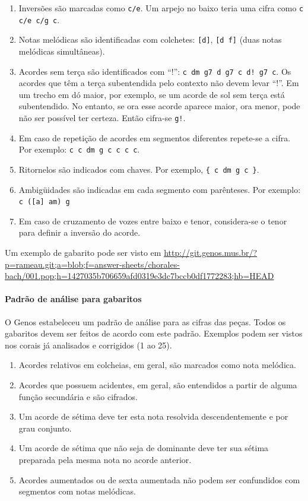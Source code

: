 \documentclass[12pt,brazil]{book}
\begin{document}
\begin{enumerate}
  \item Inversões são marcadas como \texttt{c/e}. Um arpejo no baixo
    teria uma cifra como \texttt{c c/e c/g c}.
\item Notas melódicas são identificadas com colchetes: \texttt{[d]},
  \texttt{[d f]} (duas notas melódicas simultâneas).
\item Acordes sem terça são identificados com ``$!$'': \texttt{c dm g7
    d g7 c d!  g7 c}. Os acordes que têm a terça subentendida pelo
  contexto não devem levar ``$!$''. Em um trecho em dó maior, por
  exemplo, se um acorde de sol sem terça está subentendido. No
  entanto, se ora esse acorde aparece maior, ora menor, pode não ser
  possível ter certeza. Então cifra-se \texttt{g!}.
\item Em caso de repetição de acordes em segmentos diferentes
  repete-se a cifra. Por exemplo: \texttt{c c dm g c c c c}.
\item Ritornelos são indicados com chaves. Por exemplo, \texttt{\{ c
    dm g c \}}.
\item Ambigüidades são indicadas em cada segmento com parênteses. Por
  exemplo: \texttt{c ([a] am) g}
\item Em caso de cruzamento de vozes entre baixo e tenor, considera-se
  o tenor para definir a inversão do acorde.
\end{enumerate}

Um exemplo de gabarito pode ser visto em
\url{http://git.genos.mus.br/?p=rameau.git;a=blob;f=answer-sheets/chorales-bach/001.pop;h=1427035b706659afd0319e3dc7bccb0df1772283;hb=HEAD}

\paragraph{Padrão de análise para gabaritos}
\label{sec:padrao-de-analise}

O Genos estabeleceu um padrão de análise para as cifras das
peças. Todos os gabaritos devem ser feitos de acordo com este
padrão. Exemplos podem ser vistos nos corais já analisados e
corrigidos (1 ao 25).

\begin{enumerate}
\item Acordes relativos em colcheias, em geral, são marcados como nota
  melódica.
\item Acordes que possuem acidentes, em geral, são entendidos a partir
  de alguma função secundária e são cifrados.
\item Um acorde de sétima deve ter esta nota resolvida
  descendentemente e por grau conjunto.
\item Um acorde de sétima que não seja de dominante deve ter sua
  sétima preparada pela mesma nota no acorde anterior.
\item Acordes aumentados ou de sexta aumentada não podem ser
  confundidos com segmentos com notas melódicas.
\end{enumerate}
\end{document}
